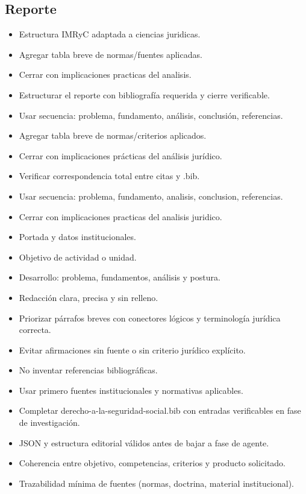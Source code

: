 \documentclass[12pt]{article}
\begin{document}
\subsection*{Reporte}
\begin{itemize}[leftmargin=*]
  \item Estructura IMRyC adaptada a ciencias juridicas.
  \item Agregar tabla breve de normas/fuentes aplicadas.
  \item Cerrar con implicaciones practicas del analisis.
  \item Estructurar el reporte con bibliografía requerida y cierre verificable.
  \item Usar secuencia: problema, fundamento, análisis, conclusión, referencias.
  \item Agregar tabla breve de normas/criterios aplicados.
  \item Cerrar con implicaciones prácticas del análisis jurídico.
  \item Verificar correspondencia total entre citas y .bib.
  \item Usar secuencia: problema, fundamento, analisis, conclusion, referencias.
  \item Cerrar con implicaciones practicas del analisis juridico.
  \item Portada y datos institucionales.
  \item Objetivo de actividad o unidad.
  \item Desarrollo: problema, fundamentos, análisis y postura.
  \item Redacción clara, precisa y sin relleno.
  \item Priorizar párrafos breves con conectores lógicos y terminología jurídica correcta.
  \item Evitar afirmaciones sin fuente o sin criterio jurídico explícito.
  \item No inventar referencias bibliográficas.
  \item Usar primero fuentes institucionales y normativas aplicables.
  \item Completar derecho-a-la-seguridad-social.bib con entradas verificables en fase de investigación.
  \item JSON y estructura editorial válidos antes de bajar a fase de agente.
  \item Coherencia entre objetivo, competencias, criterios y producto solicitado.
  \item Trazabilidad mínima de fuentes (normas, doctrina, material institucional).
\end{itemize}
\end{document}
